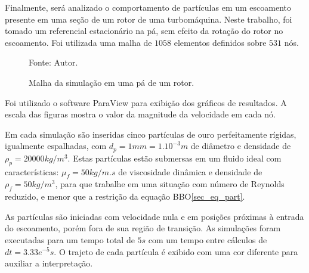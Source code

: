\begin{itemize}
        Finalmente, será analizado o comportamento de partículas em um escoamento presente em uma seção de um rotor de uma turbomáquina.
        Neste trabalho, foi tomado um referencial estacionário na pá, sem efeito da rotação do rotor no escoamento.
        Foi utilizada uma malha de $1058$ elementos definidos sobre $531$ nós.
        \begin{figure}[H]
            \centering
             {\raggedleft \scriptsize Fonte: Autor.}
            \caption{Malha da simulação em uma pá de um rotor.}
            \label{rotor_mesh}
        \end{figure}
\end{itemize}

Foi utilizado o software ParaView para exibição dos gráficos de resultados.
A escala das figuras mostra o valor da magnitude da velocidade em cada nó.

Em cada simulação são inseridas cinco partículas de ouro perfeitamente rígidas, igualmente espalhadas, com $d_p=1mm=1.10^{-3}m$ de diâmetro e densidade de $\rho_p=20000kg/m^3$.
Estas partículas estão submersas em um fluido ideal com características: $\mu_f=50kg/m.s$ de viscosidade dinâmica e densidade de $\rho_f=50kg/m^3$, para que trabalhe em uma situação com número de Reynolds reduzido, e menor que a restrição da equação BBO\ref{sec_eq_part}.

As partículas são iniciadas com velocidade nula e em posições próximas à entrada do escoamento, porém fora de sua região de transição.
As simulações foram executadas para um tempo total de $5s$ com um tempo entre cálculos de $dt=3.33e^{-5}s$.
O trajeto de cada partícula é exibido com uma cor diferente para auxiliar a interpretação. 


